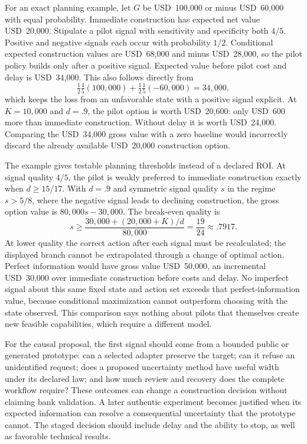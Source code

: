 For an exact planning example, let $G$ be USD~100,000 or minus USD~60,000 with
equal probability. Immediate construction has expected net value USD~20,000.
Stipulate a pilot signal with sensitivity and specificity both $4/5$. Positive
and negative signals each occur with probability $1/2$. Conditional expected
construction values are USD~68,000 and minus USD~28,000, so the pilot policy
builds only after a positive signal. Expected value before pilot cost and delay
is USD~34,000. This also follows directly from
\[
 \tfrac12\tfrac45(100{,}000)
       +\tfrac12\tfrac15(-60{,}000)=34{,}000,
\]
which keeps the loss from an unfavorable state with a positive signal explicit.
At $K=10{,}000$ and $d=.9$, the pilot option is worth USD~20,600: only USD~600
more than immediate construction. Without delay it is worth USD~24,000.
Comparing the USD~34,000 gross value with a zero baseline would incorrectly
discard the already available USD~20,000 construction option.
\citep{exec14_l8_economics}

The example gives testable planning thresholds instead of a declared ROI.
At signal quality $4/5$, the pilot is weakly preferred to immediate construction exactly when
$d\geq15/17$. With $d=.9$ and symmetric signal quality $s$ in the regime
$s>5/8$, where the negative signal leads to declining construction, the gross
option value is $80{,}000s-30{,}000$. The break-even quality is
\[
 s\geq \frac{30{,}000+(20{,}000+K)/d}{80{,}000}
       =\frac{19}{24}\approx.7917.
\]
At lower quality the correct action after each signal must be recalculated;
the displayed branch cannot be extrapolated through a change of optimal action.
Perfect information would have gross value USD~50,000, an incremental
USD~30,000 over immediate construction before costs and delay. No imperfect
signal about this same fixed state and action set exceeds that perfect-information
value, because conditional maximization cannot outperform choosing with the
state observed. This comparison says nothing about pilots that themselves
create new feasible capabilities, which require a different model.
\citep{exec14_l8_economics}

For the causal proposal, the first signal should come from a bounded public or
generated prototype: can a selected adapter preserve the target; can it refuse
an unidentified request; does a proposed uncertainty method have useful width
under its declared law; and how much review and recovery does the complete
workflow require? These outcomes can change a construction decision without
claiming bank validation. A later authentic experiment becomes justified when
its expected information can resolve a consequential uncertainty that the
prototype cannot. The staged decision should include delay and the ability to
stop, as well as favorable technical results. \citep{exec14_l8_design}

